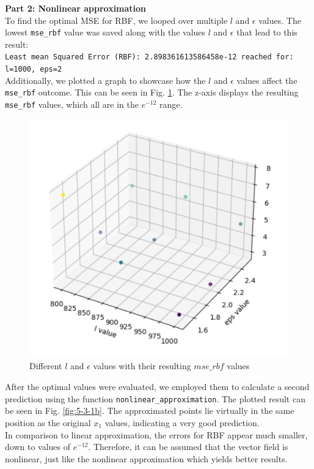 
\textbf{Part 2: Nonlinear approximation} \\
To find the optimal MSE for RBF, we looped over multiple $l$ and $\epsilon$ values. The lowest \texttt{mse\_rbf} value was saved along with the values $l$ and $\epsilon$ that lead to this result: \\
\texttt{Least mean Squared Error (RBF): 2.898361613586458e-12 reached for: l=1000, eps=2} \\

Additionally, we plotted a graph to showcase how the $l$ and $\epsilon$ values affect the \texttt{mse\_rbf} outcome. This can be seen in Fig. \ref{fig:5-3-2}. The z-axis displays the resulting \texttt{mse\_rbf} values, which all are in the $e^{-12}$ range. 

\begin{figure}[H]
    \centering
    \includegraphics[width=0.5\linewidth]{images/5_3_2_value-comparison.png}
    \caption{Different $l$ and $\epsilon$ values with their resulting $mse\_rbf$ values}
    \label{fig:5-3-2}
\end{figure}

After the optimal values were evaluated, we employed them to calculate a second prediction using the function \texttt{nonlinear\_approximation}. The plotted result can be seen in Fig. \ref{fig:5-3-1b}. The approximated points lie virtually in the same position as the original $x_1$ values, indicating a very good prediction. \\ 

In comparison to linear approximation, the errors for RBF appear much smaller, down to values of $e^{-12}$. Therefore, it can be assumed that the vector field is nonlinear, just like the nonlinear approximation which yields better results. \\

